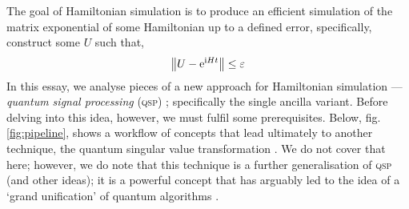 \documentclass{article}
\begin{document}
The goal of Hamiltonian simulation is to produce an efficient simulation of the matrix exponential of some Hamiltonian up to a defined error, specifically, construct some $U$ such that,
\begin{equation}\label{eq:expH_norm}
    \norm{U - \mathrm{e}^{\mathrm{i} Ht}} \leq \varepsilon
\end{equation}
In this essay, we analyse pieces of a new approach for Hamiltonian simulation --- \emph{quantum signal processing} (\textsc{qsp}) \cite{LC17}; specifically the single ancilla variant. Before delving into this idea, however, we must fulfil some prerequisites. Below, fig. \ref{fig:pipeline}, shows a workflow of concepts that lead ultimately to another technique, the quantum singular value transformation \cite{GSLW19}. We do not cover that here; however, we do note that this technique is a further generalisation of \textsc{qsp} (and other ideas); it is a powerful concept that has arguably led to the idea of a `grand unification' of quantum algorithms \cite{MRTC21}.
\end{document}
